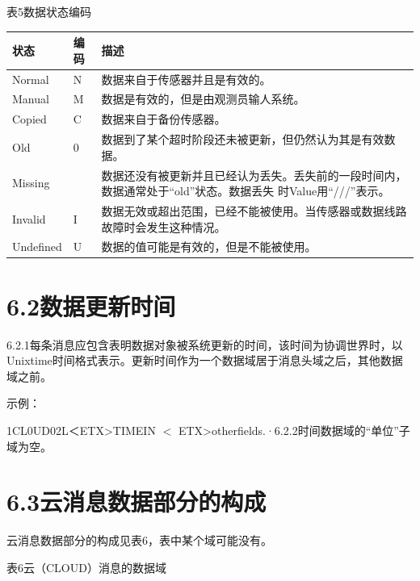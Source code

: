 \documentclass[
  10
]{article}
\begin{document}
表5数据状态编码

\begin{longtable}[]{@{}|l|l|l|@{}}
\toprule\noalign{}
\endhead
\bottomrule\noalign{}
\endlastfoot
\hline
状态 & 编码 & 描述 \\
\hline
Normal & N & 数据来自于传感器并且是有效的。 \\
\hline
Manual & M & 数据是有效的，但是由观测员输人系统。 \\
\hline
Copied & C & 数据来自于备份传感器。 \\
\hline
Old & 0 & 数据到了某个超时阶段还未被更新，但仍然认为其是有效数据。 \\
\hline
Missing & &
数据还没有被更新并且已经认为丢失。丢失前的一段时间内，数据通常处于``old''状态。数据丢失
时Value用``///''表示。 \\
\hline
Invalid & I &
数据无效或超出范围，已经不能被使用。当传感器或数据线路故障时会发生这种情况。 \\
\hline
Undefined & U & 数据的值可能是有效的，但是不能被使用。 \\
\hline
\end{longtable}

\section{6.2数据更新时间}\label{ux6570ux636eux66f4ux65b0ux65f6ux95f4}

6.2.1每条消息应包含表明数据对象被系统更新的时间，该时间为协调世界时，以Unixtime时间格式表示。更新时间作为一个数据域居于消息头域之后，其他数据域之前。

示例：

1\textbar CL0UD\textbar02L＜ETX\textgreater TIME\textbar I\textbar N\textbar{}
\(<\) ETX\textgreater otherfields.·6.2.2时间数据域的``单位''子域为空。

\section{6.3云消息数据部分的构成}\label{ux4e91ux6d88ux606fux6570ux636eux90e8ux5206ux7684ux6784ux6210}

云消息数据部分的构成见表6，表中某个域可能没有。

表6云（CLOUD）消息的数据域
\end{document}
